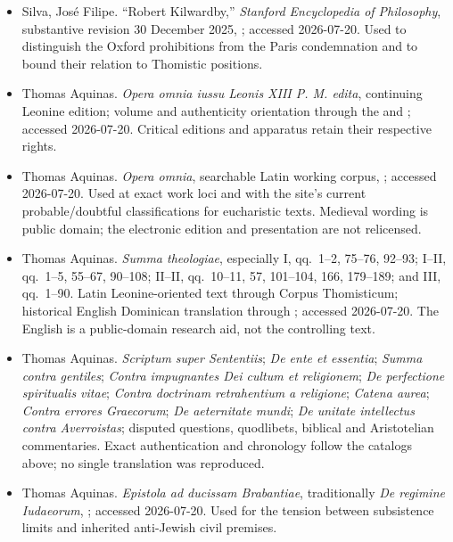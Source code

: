 \begin{itemize}
\item Silva, José Filipe.  ``Robert Kilwardby,'' \emph{Stanford Encyclopedia
of Philosophy}, substantive revision 30 December 2025,
;
accessed 2026-07-20.  Used to distinguish the Oxford prohibitions from the
Paris condemnation and to bound their relation to Thomistic positions.

\item Thomas Aquinas.  \emph{Opera omnia iussu Leonis XIII P. M. edita},
continuing Leonine edition; volume and authenticity orientation through the
 and
; accessed 2026-07-20.  Critical editions and apparatus retain their
respective rights.

\item Thomas Aquinas.  \emph{Opera omnia}, searchable Latin working corpus,
;
accessed 2026-07-20.  Used at exact work loci and with the site's current
probable/doubtful classifications for eucharistic texts.  Medieval wording is
public domain; the electronic edition and presentation are not relicensed.

\item Thomas Aquinas.  \emph{Summa theologiae}, especially I, qq.~1--2,
75--76, 92--93; I--II, qq.~1--5, 55--67, 90--108; II--II, qq.~10--11,
57, 101--104, 166, 179--189; and III, qq.~1--90.  Latin Leonine-oriented text
through Corpus Thomisticum; historical English Dominican translation through
; accessed 2026-07-20.
The English is a public-domain research aid, not the controlling text.

\item Thomas Aquinas.  \emph{Scriptum super Sententiis}; \emph{De ente et
essentia}; \emph{Summa contra gentiles}; \emph{Contra impugnantes Dei cultum
et religionem}; \emph{De perfectione spiritualis vitae}; \emph{Contra
doctrinam retrahentium a religione}; \emph{Catena aurea}; \emph{Contra errores
Graecorum}; \emph{De aeternitate mundi}; \emph{De unitate intellectus contra
Averroistas}; disputed questions, quodlibets, biblical and Aristotelian
commentaries.  Exact authentication and chronology follow the catalogs above;
no single translation was reproduced.

\item Thomas Aquinas.  \emph{Epistola ad ducissam Brabantiae}, traditionally
\emph{De regimine Iudaeorum},
; accessed
2026-07-20.  Used for the tension between subsistence limits and inherited
anti-Jewish civil premises.
\end{itemize}

